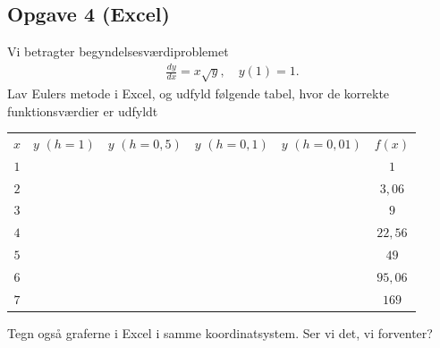 \subsection*{Opgave 4 (Excel)}
Vi betragter begyndelsesværdiproblemet 
\begin{align*}
	\frac{dy}{dx} = x\sqrt{y}, \quad y(1) = 1.
\end{align*}
Lav Eulers metode i Excel, og udfyld følgende tabel, hvor de korrekte funktionsværdier er udfyldt
\begin{center}
	\begin{tabular}{cccccc}
		$x$ & $y$ $(h = 1)$ & $y$ $(h = 0,\!5)$ & $y$ $(h = 0,\!1)$ & $y$ $(h = 0,\!01)$ & $f(x)$\\
		$1$ & & & & & $1$\\
		$2$& & & & & $3,\!06$\\
		$3$& & & & & $9$\\
		$4$& & & & & $22,\!56$\\
		$5$& & & & & $49$\\
		$6$& & & & & $95,\!06$\\
		$7$& & & & & $169$\\
	\end{tabular}
\end{center}
Tegn også graferne i Excel i samme koordinatsystem. Ser vi det, vi forventer?